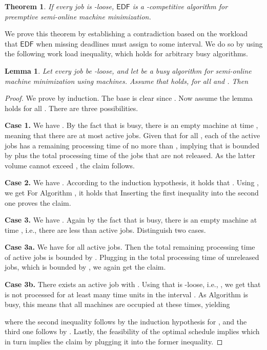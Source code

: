 \documentclass[letterpaper,11pt]{article}
\newtheorem{theorem}{Theorem}
\newtheorem{lemma}{Lemma}
\newcommand{\EDF}{\ensuremath{\mathsf{EDF}}\xspace}
\begin{document}
\begin{theorem}\label{thm: EDF-small}
If every job is -loose, \EDF is a -competitive algorithm for preemptive semi-online machine minimization.
\end{theorem}
We prove this theorem by establishing a contradiction based on the workload that \EDF when missing deadlines must assign to some interval.
We do so by using the following work load inequality, which holds for arbitrary busy algorithms.


\begin{lemma}\label{lemma: small-busy-load}
Let every job be -loose,  and let  be a busy algorithm for semi-online machine minimization using  machines. Assume that  holds, for all  and . Then 
\end{lemma} 

\begin{proof}
We prove by induction. The base is clear since . Now assume the lemma holds for all . There are three possibilities.

\noindent\textbf{Case 1.} We have . By the fact that  is busy, there is an empty machine at time , meaning that there are at most  active jobs. Given that  for all , each of the active jobs has a remaining processing time of no more than , implying that  is bounded by  plus the total processing time of the jobs that are not released. As the latter volume cannot exceed , the claim follows.

\noindent\textbf{Case 2.} We have . According to the induction hypothesis, it holds that . Using , we get  For Algorithm , it holds that  Inserting the first inequality into the second one proves the claim.

\noindent\textbf{Case 3.} We have . Again by the fact that  is busy, there is an empty machine at time , i.e., there are less than  active jobs. Distinguish two cases.

\noindent\textbf{Case 3a.} We have  for all active jobs. Then the total remaining processing time of active jobs is bounded by . Plugging in the total processing time of unreleased jobs, which is bounded by , we again get the claim.

\noindent\textbf{Case 3b.} There exists an active job  with . Using that  is -loose, i.e., , we get that  is not processed for at least  many time units in the interval . As Algorithm  is busy, this means that all machines are occupied at these times, yielding

where the second inequality follows by the induction hypothesis for , and the third one follows by . Lastly, the feasibility of the optimal schedule implies  which in turn implies the claim by plugging it into the former inequality.
\end{proof}
\end{document}
